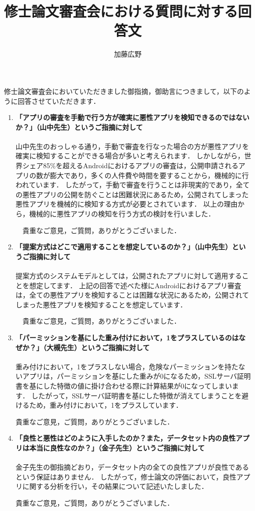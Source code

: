 \documentclass[11pt, a4paper]{article}
\title{修士論文審査会における質問に対する回答文}
\author{加藤広野}
\begin{document}
\maketitle
修士論文審査会においていただきました御指摘，御助言につきまして，以下のように回答させていただきます．

\begin{enumerate} 
  \item \textbf{「アプリの審査を手動で行う方が確実に悪性アプリを検知できるのではないか？」（山中先生）というご指摘に対して}\\ \\
    山中先生のおっしゃる通り，手動で審査を行なった場合の方が悪性アプリを確実に検知することができる場合が多いと考えられます．
    しかしながら，世界シェア85\%を超えるAndroidにおけるアプリの審査は，公開申請されるアプリの数が膨大であり，多くの人件費や時間を要することから，機械的に行われています．
    したがって，手動で審査を行うことは非現実的であり，全ての悪性アプリの公開を防ぐことは困難状況にあるため，公開されてしまった悪性アプリを機械的に検知する方式が必要とされています．
    以上の理由から，機械的に悪性アプリの検知を行う方式の検討を行いました．

    　貴重なご意見，ご質問，ありがとうございました．
  \vspace{10mm}

  \item \textbf{「提案方式はどこで適用することを想定しているのか？」（山中先生）というご指摘に対して}\\ \\
    提案方式のシステムモデルとしては，公開されたアプリに対して適用することを想定してます．
    上記の回答で述べた様にAndroidにおけるアプリ審査は，全ての悪性アプリを検知することは困難な状況にあるため，公開されてしまった悪性アプリを検知することを想定しています．

    　貴重なご意見，ご質問，ありがとうございました．
  \vspace{10mm}

  \item \textbf{「パーミッションを基にした重み付けにおいて，1をプラスしているのはなぜか？」（大槻先生）というご指摘に対して}\\ \\
    重み付けにおいて，1をプラスしない場合，危険なパーミッションを持たないアプリは，パーミッションを基にした重みが0になるため，SSLサーバ証明書を基にした特徴の値に掛け合わせる際に計算結果が0になってしまいます．
    したがって，SSLサーバ証明書を基にした特徴が消えてしまうことを避けるため，重み付けにおいて，1をプラスしています．

    貴重なご意見，ご質問，ありがとうございました．
  \vspace{10mm}

  \item \textbf{「良性と悪性はどのように入手したのか？また，データセット内の良性アプリは本当に良性なのか？」（金子先生）というご指摘に対して}\\ \\
    金子先生の御指摘どおり，データセット内の全ての良性アプリが良性であるという保証はありません．
    したがって，修士論文の評価において，良性アプリに関する分析を行い，その結果について記述いたしました．

    貴重なご意見，ご質問，ありがとうございました．
\end{enumerate}
\end{document}
